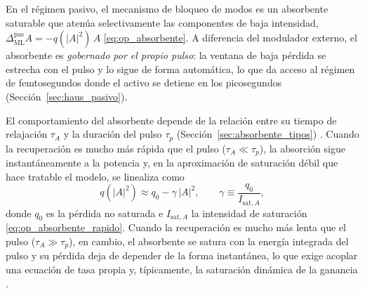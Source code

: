 En el régimen pasivo, el mecanismo de bloqueo de modos es un absorbente saturable
que atenúa selectivamente las componentes de baja intensidad,
$\Delta_{\mathrm{ML}}^{\text{pas}}A=-q(|A|^2)\,A$ \eqref{eq:op_absorbente}. A
diferencia del modulador externo, el absorbente es \emph{gobernado por el propio
pulso}: la ventana de baja pérdida se estrecha con el pulso y lo sigue de forma
automática, lo que da acceso al régimen de femtosegundos donde el activo se detiene
en los picosegundos (Sección~\ref{sec:haus_pasivo}).

El comportamiento del absorbente depende de la relación entre su tiempo de
relajación $\tau_A$ y la duración del pulso $\tau_p$
(Sección~\ref{sec:absorbente_tipos}) \cite{Keller2022}. Cuando la recuperación es
mucho más rápida que el pulso ($\tau_A\ll\tau_p$), la absorción sigue
instantáneamente a la potencia y, en la aproximación de saturación débil que hace
tratable el modelo, se linealiza como
%
\begin{equation}
    q\!\left(|A|^2\right) \approx q_0 - \gamma\,|A|^2,
    \qquad \gamma \equiv \frac{q_0}{I_{\mathrm{sat},A}},
    \label{eq:sim_absorbente_rapido}
\end{equation}
%
donde $q_0$ es la pérdida no saturada e $I_{\mathrm{sat},A}$ la intensidad de
saturación \eqref{eq:op_absorbente_rapido}. Cuando la recuperación es mucho más
lenta que el pulso ($\tau_A\gg\tau_p$), en cambio, el absorbente se satura con la
energía integrada del pulso y su pérdida deja de depender de la forma instantánea,
lo que exige acoplar una ecuación de tasa propia y, típicamente, la saturación
dinámica de la ganancia \cite{Keller2022,Kaertner2020}.

